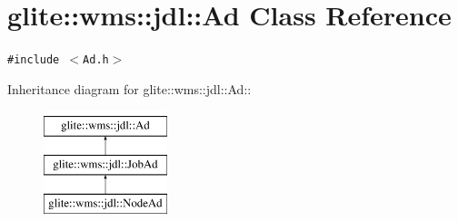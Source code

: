 \hypertarget{classglite_1_1wms_1_1jdl_1_1Ad}{
\section{glite::wms::jdl::Ad Class Reference}
\label{classglite_1_1wms_1_1jdl_1_1Ad}
}
{\tt \#include $<$Ad.h$>$}

Inheritance diagram for glite::wms::jdl::Ad::\begin{figure}[H]
\begin{center}
\leavevmode
\includegraphics[height=3cm]{classglite_1_1wms_1_1jdl_1_1Ad}
\end{center}
\end{figure}
